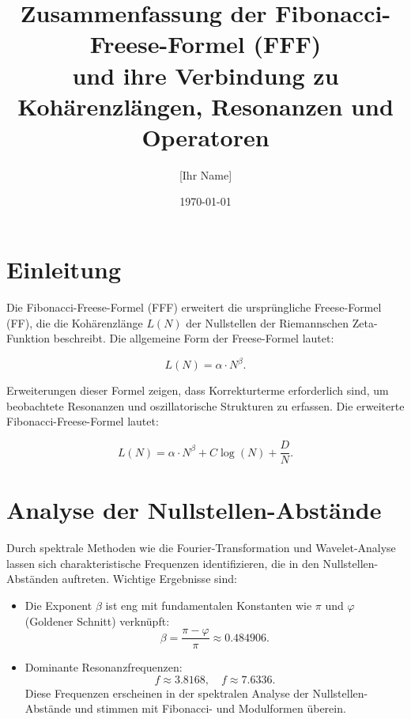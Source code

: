 \documentclass[a4paper,12pt]{article}
\title{Zusammenfassung der Fibonacci-Freese-Formel (FFF) \\ 
und ihre Verbindung zu Kohärenzlängen, Resonanzen und Operatoren}
\author{[Ihr Name]}
\date{\today}
\begin{document}
\maketitle

\section{Einleitung}
Die Fibonacci-Freese-Formel (FFF) erweitert die ursprüngliche Freese-Formel (FF), die die Kohärenzlänge \( L(N) \) der Nullstellen der Riemannschen Zeta-Funktion beschreibt. Die allgemeine Form der Freese-Formel lautet:

\begin{equation}
    L(N) = \alpha \cdot N^\beta.
\end{equation}

Erweiterungen dieser Formel zeigen, dass Korrekturterme erforderlich sind, um beobachtete Resonanzen und oszillatorische Strukturen zu erfassen. Die erweiterte Fibonacci-Freese-Formel lautet:

\begin{equation}
    L(N) = \alpha \cdot N^\beta + C \log(N) + \frac{D}{N}.
\end{equation}

\section{Analyse der Nullstellen-Abstände}
Durch spektrale Methoden wie die Fourier-Transformation und Wavelet-Analyse lassen sich charakteristische Frequenzen identifizieren, die in den Nullstellen-Abständen auftreten. Wichtige Ergebnisse sind:

\begin{itemize}
    \item Die Exponent \(\beta\) ist eng mit fundamentalen Konstanten wie \(\pi\) und \(\varphi\) (Goldener Schnitt) verknüpft:
    \begin{equation}
        \beta = \frac{\pi - \varphi}{\pi} \approx 0.484906.
    \end{equation}
    \item Dominante Resonanzfrequenzen:
    \begin{equation}
        f \approx 3.8168, \quad f \approx 7.6336.
    \end{equation}
    Diese Frequenzen erscheinen in der spektralen Analyse der Nullstellen-Abstände und stimmen mit Fibonacci- und Modulformen überein.
\end{itemize}
\end{document}
